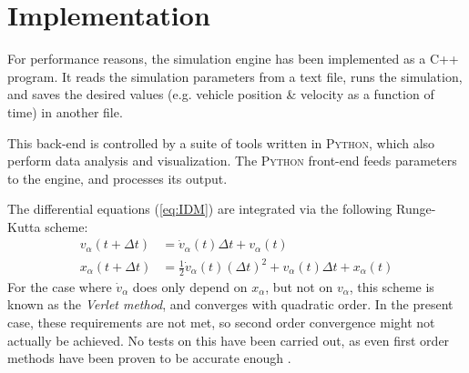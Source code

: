 \section{Implementation}
For performance reasons, the simulation engine has been implemented as a \textsc{C++} program. It reads the simulation parameters from a text file, runs the simulation, and saves the desired values (e.g. vehicle position \& velocity as a function of time) in another file.

This back-end is controlled by a suite of tools written in \textsc{Python}, which also perform data analysis and visualization. The \textsc{Python} front-end feeds parameters to the engine, and processes its output.

The differential equations (\ref{eq:IDM}) are integrated via the following Runge-Kutta scheme:
\begin{align*}
v_\alpha(t+\Delta t) &= \dot v_\alpha(t)\Delta t+v_\alpha(t) \\
x_\alpha(t+\Delta t) &= \frac{1}{2}\dot v_\alpha(t) (\Delta t)^2 + v_\alpha(t)\Delta t + x_\alpha(t)
\end{align*}
For the case where $\dot v_\alpha$ does only depend on $x_\alpha$, but not on $v_\alpha$, this scheme is known as the \emph{Verlet method}, and converges with quadratic order. In the present case, these requirements are not met, so second order convergence might not actually be achieved. No tests on this have been carried out, as even first order methods have been proven to be accurate enough \cite{treiber2015}.
